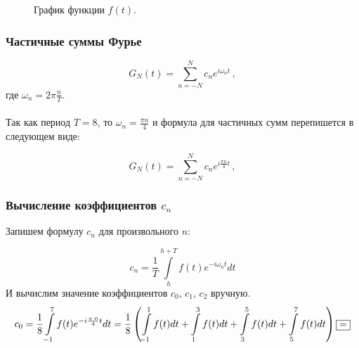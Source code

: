 \documentclass[a5paper, 10pt]{article}
\theoremstyle{definition}
\theoremstyle{plain}
\theoremstyle{remark}
\begin{document}
\begin{figure}[h]
\caption{График функции $f(t)$.}
\end{figure}

\subsubsection{Частичные суммы Фурье}

\begin{equation}
G_N (t) = \sum  \limits_{n=-N}^N c_n e^{i \omega_n t} \, ,
\end{equation}
где $\omega_n = 2 \pi \frac{n}{T}$.\\
\\
Так как период $T = 8$, то $\omega_n = \frac{\pi n}{4}$ и формула для частичных сумм перепишется в следующем виде:

\begin{equation}
G_N (t) = \sum  \limits_{n=-N}^N c_n e^{i \frac{\pi n}{4} t} \, ,
\end{equation}


\subsubsection{Вычисление коэффициентов $c_n$}
Запишем формулу $c_n$ для произвольного $n$:

\begin{equation}
c_n = \frac{1}{T} \int \limits_{h}^{h + T} f(t) e^{-i \omega_n t} dt 
\end{equation}
И вычислим значение коэффициентов $c_0$, $c_1$, $c_2$ вручную.
\begin{multline*}
c_0 = \frac{1}{8} \int \limits_{-1}^{7} f(t) e^{-i \frac{\pi \cdot 0}{4} t} dt  = \frac{1}{8} \left(\int \limits_{-1}^{1} f(t) dt +
 \int \limits_{1}^{3} f(t) dt + \int \limits_{3}^{5} f(t) dt + \int \limits_{5}^{7} f(t) dt   \right) \fbox{=}
\end{multline*}
\end{document}
